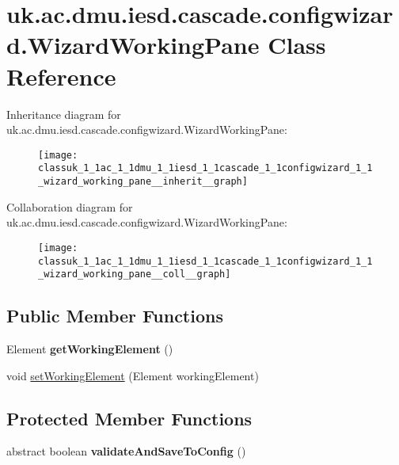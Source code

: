 \hypertarget{classuk_1_1ac_1_1dmu_1_1iesd_1_1cascade_1_1configwizard_1_1_wizard_working_pane}{\section{uk.\-ac.\-dmu.\-iesd.\-cascade.\-configwizard.\-Wizard\-Working\-Pane Class Reference}
\label{classuk_1_1ac_1_1dmu_1_1iesd_1_1cascade_1_1configwizard_1_1_wizard_working_pane}
}


Inheritance diagram for uk.\-ac.\-dmu.\-iesd.\-cascade.\-configwizard.\-Wizard\-Working\-Pane\-:\nopagebreak
\begin{figure}[H]
\begin{center}
\leavevmode
\texttt{[image: classuk\_1\_1ac\_1\_1dmu\_1\_1iesd\_1\_1cascade\_1\_1configwizard\_1\_1\_wizard\_working\_pane\_\_inherit\_\_graph]}
\end{center}
\end{figure}


Collaboration diagram for uk.\-ac.\-dmu.\-iesd.\-cascade.\-configwizard.\-Wizard\-Working\-Pane\-:\nopagebreak
\begin{figure}[H]
\begin{center}
\leavevmode
\texttt{[image: classuk\_1\_1ac\_1\_1dmu\_1\_1iesd\_1\_1cascade\_1\_1configwizard\_1\_1\_wizard\_working\_pane\_\_coll\_\_graph]}
\end{center}
\end{figure}
\subsection*{Public Member Functions}
\begin{DoxyCompactItemize}
\item 
\hypertarget{classuk_1_1ac_1_1dmu_1_1iesd_1_1cascade_1_1configwizard_1_1_wizard_working_pane_a9b37272e17821df5602c8ec68a94ee1c}{Element {\bfseries get\-Working\-Element} ()}\label{classuk_1_1ac_1_1dmu_1_1iesd_1_1cascade_1_1configwizard_1_1_wizard_working_pane_a9b37272e17821df5602c8ec68a94ee1c}

\item 
void \hyperlink{classuk_1_1ac_1_1dmu_1_1iesd_1_1cascade_1_1configwizard_1_1_wizard_working_pane_a1ef9c773c1b4021ea567cdb8e0dc61ba}{set\-Working\-Element} (Element working\-Element)
\end{DoxyCompactItemize}
\subsection*{Protected Member Functions}
\begin{DoxyCompactItemize}
\item 
\hypertarget{classuk_1_1ac_1_1dmu_1_1iesd_1_1cascade_1_1configwizard_1_1_wizard_working_pane_a0d1aad63257cad0adbe06cdf2aa6e273}{abstract boolean {\bfseries validate\-And\-Save\-To\-Config} ()}\label{classuk_1_1ac_1_1dmu_1_1iesd_1_1cascade_1_1configwizard_1_1_wizard_working_pane_a0d1aad63257cad0adbe06cdf2aa6e273}

\end{DoxyCompactItemize}


